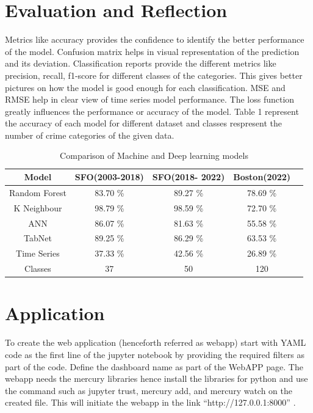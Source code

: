 \documentclass[conference,final,]{IEEEtran}
\begin{document}
\section{Evaluation and Reflection}\label{evaluation-and-reflection}

Metrics like accuracy provides the confidence to identify the better performance
of the model. Confusion matrix helps in visual representation of the prediction
and its deviation. Classification reports provide the different metrics
like precision, recall, f1-score for different classes of the categories. This
gives better pictures on how the model is good enough for each
classification. MSE and RMSE help in clear view of time series model
performance. The loss function greatly influences the performance or
accuracy of the model. Table 1 represent the accuracy of each model for different dataset
and classes respresent the number of crime categories of the given data.

\begin{table}[ht]
\centering
\begin{tabular}{|c|c|c|c|c|}
\hline
Model & SFO(2003-2018) & SFO(2018- 2022) & Boston(2022)\\ \hline
Random Forest & 83.70 \% & 89.27 \% & 78.69 \% \\ \hline
K Neighbour   & 98.79 \% & 98.59 \% & 72.70 \% \\ \hline
ANN           & 86.07 \% & 81.63 \% & 55.58 \% \\ \hline
TabNet        & 89.25 \% & 86.29 \% & 63.53 \% \\ \hline
Time Series   & 37.33 \% & 42.56 \% & 26.89 \% \\ \hline
Classes & 37 & 50 & 120 \\ \hline
\end{tabular}
\vspace{10pt}
\caption{Comparison of Machine and Deep learning models}
\label{tab:example_table}
\end{table}

\section{Application}\label{application}

To create the web application (henceforth referred as webapp) start with
YAML code as the first line of the jupyter notebook by providing the
required filters as part of the code. Define the dashboard name as part
of the WebAPP page. The webapp needs the mercury libraries hence install
the libraries for python and use the command such as jupyter trust,
mercury add, and mercury watch on the created file. This will initiate
the webapp in the link ``http://127.0.0.1:8000'' .
\end{document}
